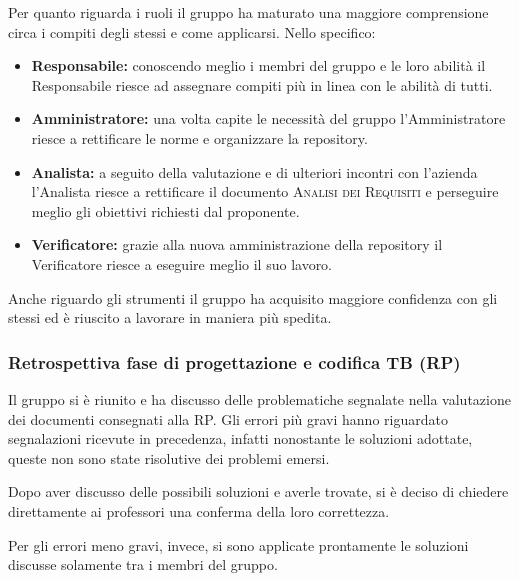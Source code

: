 \documentclass[../piano_di_qualifica.tex]{subfiles}
\begin{document}
Per quanto riguarda i ruoli il gruppo ha maturato una maggiore comprensione circa i compiti degli stessi e come applicarsi. Nello specifico:
\begin{itemize}
	\item \textbf{Responsabile:} conoscendo meglio i membri del gruppo e le loro abilità il Responsabile riesce ad assegnare compiti più in linea con le abilità di tutti.
	\item \textbf{Amministratore:} una volta capite le necessità del gruppo l'Amministratore riesce a rettificare le norme e organizzare la repository.
	\item \textbf{Analista:} a seguito della valutazione e di ulteriori incontri con l'azienda l'Analista riesce a rettificare il documento \textsc{Analisi dei Requisiti} e perseguire meglio gli obiettivi richiesti dal proponente.
	\item \textbf{Verificatore:} grazie alla nuova amministrazione della repository il Verificatore riesce a eseguire meglio il suo lavoro.
\end{itemize}

Anche riguardo gli strumenti il gruppo ha acquisito maggiore confidenza con gli stessi ed è riuscito a lavorare in maniera più spedita.

\subsubsection{Retrospettiva fase di progettazione e codifica TB (RP)}
\label{par:retrospettiva-RP}

Il gruppo si è riunito e ha discusso delle problematiche segnalate nella valutazione dei documenti consegnati alla RP.
Gli errori più gravi hanno riguardato segnalazioni ricevute in precedenza, infatti nonostante le soluzioni adottate, queste non sono state risolutive dei problemi emersi.

Dopo aver discusso delle possibili soluzioni e averle trovate, si è deciso di chiedere direttamente ai professori una conferma della loro correttezza.

Per gli errori meno gravi, invece, si sono applicate prontamente le soluzioni discusse solamente tra i membri del gruppo.
\end{document}

